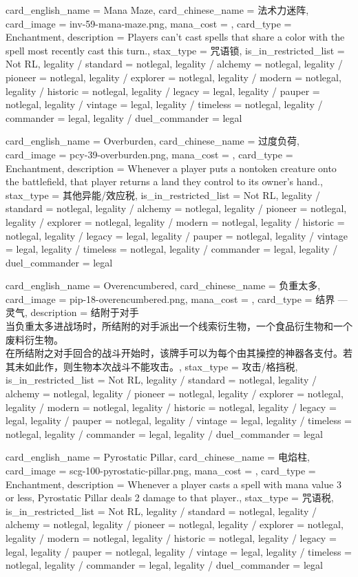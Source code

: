 \documentclass[lang = cn, color = black, 10pt]{AllThatStax}
\begin{document}
\card
{
	card_english_name = {Mana Maze},
	card_chinese_name = {法术力迷阵},
	card_image = inv-59-mana-maze.png,
	mana_cost = ,
	card_type = Enchantment,
	description = {Players can't cast spells that share a color with the spell most recently cast this turn.},
	stax_type = 咒语锁,
	is_in_restricted_list = Not RL,
	legality / standard = notlegal,
	legality / alchemy = notlegal,
	legality / pioneer = notlegal,
	legality / explorer = notlegal,
	legality / modern = notlegal,
	legality / historic = notlegal,
	legality / legacy = legal,
	legality / pauper = notlegal,
	legality / vintage = legal,
	legality / timeless = notlegal,
	legality / commander = legal,
	legality / duel_commander = legal
}

\card
{
	card_english_name = {Overburden},
	card_chinese_name = {过度负荷},
	card_image = pcy-39-overburden.png,
	mana_cost = ,
	card_type = Enchantment,
	description = {Whenever a player puts a nontoken creature onto the battlefield, that player returns a land they control to its owner's hand.},
	stax_type = 其他异能/效应税,
	is_in_restricted_list = Not RL,
	legality / standard = notlegal,
	legality / alchemy = notlegal,
	legality / pioneer = notlegal,
	legality / explorer = notlegal,
	legality / modern = notlegal,
	legality / historic = notlegal,
	legality / legacy = legal,
	legality / pauper = notlegal,
	legality / vintage = legal,
	legality / timeless = notlegal,
	legality / commander = legal,
	legality / duel_commander = legal
}

\card
{
	card_english_name = {Overencumbered},
	card_chinese_name = {负重太多},
	card_image = pip-18-overencumbered.png,
	mana_cost = ,
	card_type = 结界 — 灵气,
	description = {结附于对手\\
		当负重太多进战场时，所结附的对手派出一个线索衍生物，一个食品衍生物和一个废料衍生物。\\
		在所结附之对手回合的战斗开始时，该牌手可以为每个由其操控的神器各支付。若其未如此作，则生物本次战斗不能攻击。},
	stax_type = 攻击/格挡税,
	is_in_restricted_list = Not RL,
	legality / standard = notlegal,
	legality / alchemy = notlegal,
	legality / pioneer = notlegal,
	legality / explorer = notlegal,
	legality / modern = notlegal,
	legality / historic = notlegal,
	legality / legacy = legal,
	legality / pauper = notlegal,
	legality / vintage = legal,
	legality / timeless = notlegal,
	legality / commander = legal,
	legality / duel_commander = legal
}

\card
{
	card_english_name = {Pyrostatic Pillar},
	card_chinese_name = {电焰柱},
	card_image = scg-100-pyrostatic-pillar.png,
	mana_cost = ,
	card_type = Enchantment,
	description = {Whenever a player casts a spell with mana value 3 or less, Pyrostatic Pillar deals 2 damage to that player.},
	stax_type = 咒语税,
	is_in_restricted_list = Not RL,
	legality / standard = notlegal,
	legality / alchemy = notlegal,
	legality / pioneer = notlegal,
	legality / explorer = notlegal,
	legality / modern = notlegal,
	legality / historic = notlegal,
	legality / legacy = legal,
	legality / pauper = notlegal,
	legality / vintage = legal,
	legality / timeless = notlegal,
	legality / commander = legal,
	legality / duel_commander = legal
}
\end{document}
